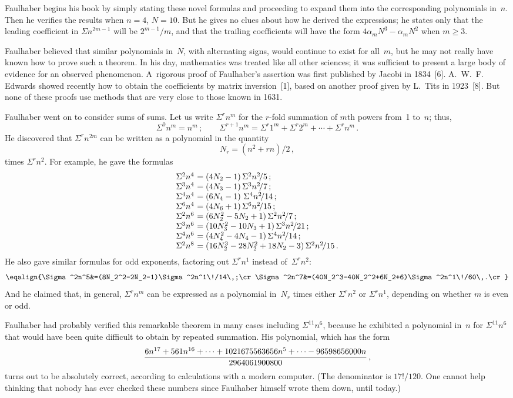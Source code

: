 Faulhaber begins his book by simply stating these novel formulas and
proceeding to expand them into the corresponding polynomials in~$n$.
Then he verifies the results when $n=4$, $N=10$. But he gives no clues
about how he derived the expressions; he states only that the leading
coefficient in $\Sigma n^{2m-1}$ will be $2^{m-1}\!/m$, and that the trailing
coefficients will have the form $4\alpha_mN^3-\alpha_mN^2$ when
$m\geq 3$. 

Faulhaber believed that similar polynomials in~$N$, with alternating
signs, would continue to exist for all~$m$, but he may not really have
known how to prove such a theorem. In his day, mathematics was treated
like all other sciences; it was sufficient to present a large body of
evidence for an observed phenomenon. A~rigorous proof of Faulhaber's
assertion was first
published by Jacobi in 1834~[6].
A.~W.~F. Edwards showed recently how to obtain the coefficients by
matrix inversion~[1],
based on another proof given by L.~Tits in 1923~[8].
But none of these proofs use methods that are very close to those
known in 1631.

Faulhaber went on to consider sums of sums. Let us write $\Sigma^rn^m$
for the $r$-fold summation of $m$th powers from~1 to~$n$; thus,
$$\Sigma^0n^m=n^m\,;\qquad
\Sigma^{r+1}n^m=\Sigma^r1^m+\Sigma^r2^m+\cdots +\Sigma^rn^m\,.$$
He discovered that $\Sigma^rn^{2m}$ can be written as a polynomial in
the quantity
$$N_r=(n^2+rn)/2\,,$$
times $\Sigma^rn^2$. For example, he gave the formulas
$$\vcenter{\halign{$#$\hfil\ &$#$\hfil\cr
\Sigma^2n^4&=(4N_2-1)\,\Sigma^2n^2\!/5\,;\cr
\Sigma^3n^4&=(4N_3-1)\,\Sigma^3n^2\!/7\,;\cr
\Sigma^4n^4&=(6N_4-1)\,\,\Sigma^4n^2\!/14\,;\cr
\Sigma^6n^4&=(4N_6+1)\,\Sigma^6n^2\!/15\,;\cr
\Sigma^2n^6&=(6N_2^2-5N_2+1)\,\Sigma^2n^2\!/7\,;\cr
\Sigma^3n^6&=(10N_3^2-10N_3+1)\,\Sigma^3n^2\!/21\,;\cr
\Sigma^4n^6&=(4N_4^2-4N_4-1)\,\Sigma^4n^2\!/14\,;\cr
\Sigma^2n^8&=(16N_2^3-28N_2^2+18N_2-3)\,\Sigma^2n^2\!/15\,.\cr}}$$
He also gave similar formulas for odd exponents, factoring out
$\Sigma^rn^1$ instead of~$\Sigma^rn^2$:
$$\eqalign{\Sigma^2n^5&=(8N_2^2-2N_2-1)\Sigma^2n^1\!/14\,;\cr
\Sigma^2n^7&=(40N_2^3-40N_2^2+6N_2+6)\Sigma^2n^1\!/60\,.\cr}$$
And he claimed that, in general, $\Sigma^rn^m$ can be expressed as a
polynomial in~$N_r$ times either $\Sigma^rn^2$ or $\Sigma^rn^1$,
depending on whether $m$ is even or odd.

Faulhaber had probably verified this remarkable theorem in many cases
including $\Sigma^{11}n^6$, because he exhibited a polynomial in~$n$
for $\Sigma^{11}n^6$ that would have been quite difficult to obtain by
repeated summation. His polynomial, which has the form
$${6n^{17}+561n^{16}+\cdots+1021675563656n^5+\cdots-96598656000n\over
2964061900800}\,,$$
turns out to be absolutely correct,
according to calculations with a modern computer. (The denominator is
$17!/120$. One cannot help
thinking that nobody has ever checked these numbers since Faulhaber
himself wrote them down, until today.)

